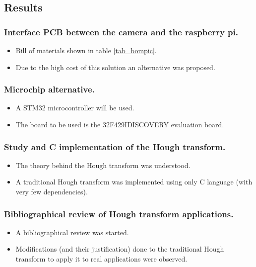 
\subsection{Results}

\subsubsection{Interface PCB between the camera and the raspberry pi.}
\begin{itemize}
	\item Bill of materials shown in table \ref{tab_bompic}.
	\item Due to the high cost of this solution an alternative was proposed.
\end{itemize}

\subsubsection{Microchip alternative.}
\begin{itemize}
	\item A STM32 microcontroller will be used.
	\item The board to be used is the 32F429IDISCOVERY evaluation board.
\end{itemize}

\subsubsection{Study and C implementation of the Hough transform.}
\begin{itemize}
	\item The theory behind the Hough transform was understood.
	\item A traditional Hough transform was implemented using only C language (with very few dependencies).
\end{itemize}

\subsubsection{Bibliographical review of Hough transform applications.}
\begin{itemize}
	\item A bibliographical review was started.
	\item Modifications (and their justification) done to the traditional Hough transform to apply it to real applications were observed.
\end{itemize}

